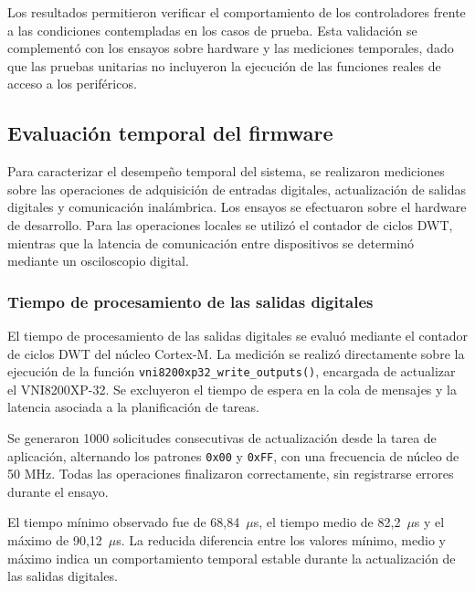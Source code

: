 Los resultados permitieron verificar el comportamiento de los controladores frente a las condiciones contempladas en los casos de prueba. Esta validación se complementó con los ensayos sobre hardware y las mediciones temporales, dado que las pruebas unitarias no incluyeron la ejecución de las funciones reales de acceso a los periféricos.

\subsection{Evaluación temporal del firmware}

Para caracterizar el desempeño temporal del sistema, se realizaron mediciones sobre las operaciones de adquisición de entradas digitales, actualización de salidas digitales y comunicación inalámbrica. Los ensayos se efectuaron sobre el hardware de desarrollo. Para las operaciones locales se utilizó el contador de ciclos DWT, mientras que la latencia de comunicación entre dispositivos se determinó mediante un osciloscopio digital.

\subsubsection{Tiempo de procesamiento de las salidas digitales}

El tiempo de procesamiento de las salidas digitales se evaluó mediante el contador de ciclos DWT del núcleo Cortex-M. La medición se realizó directamente sobre la ejecución de la función \texttt{vni8200xp32\_write\_outputs()}, encargada de actualizar el VNI8200XP-32. Se excluyeron el tiempo de espera en la cola de mensajes y la latencia asociada a la planificación de tareas.

Se generaron 1000 solicitudes consecutivas de actualización desde la tarea de aplicación, alternando los patrones \texttt{0x00} y \texttt{0xFF}, con una frecuencia de núcleo de 50 MHz. Todas las operaciones finalizaron correctamente, sin registrarse errores durante el ensayo.

El tiempo mínimo observado fue de 68,84~$\mu$s, el tiempo medio de 82,2~$\mu$s y el máximo de 90,12~$\mu$s. La reducida diferencia entre los valores mínimo, medio y máximo indica un comportamiento temporal estable durante la actualización de las salidas digitales.

